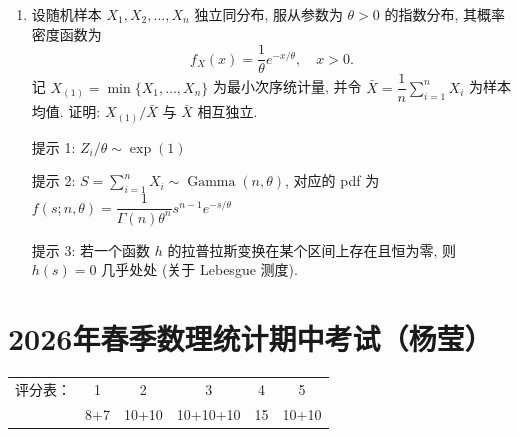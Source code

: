 \begin{enumerate}
\item 设随机样本 $X_1,X_2,\ldots,X_n$ 独立同分布, 服从参数为 $\theta>0$ 的指数分布, 其概率密度函数为
\[
f_X(x)=\frac{1}{\theta}e^{-x/\theta},\quad x>0.
\]
记 $X_{(1)}=\min\{X_1,\ldots,X_n\}$ 为最小次序统计量, 并令 $\bar{X}=\dfrac{1}{n}\sum_{i=1}^n X_i$ 为样本均值. 证明: $X_{(1)}/\bar{X}$ 与 $\bar{X}$ 相互独立.

提示 1: $Z_i/\theta\sim \exp(1)$

提示 2: $S=\sum_{i=1}^n X_i\sim \operatorname{Gamma}(n,\theta)$, 对应的 pdf 为 $f(s;n,\theta)=\dfrac{1}{\Gamma(n)\theta^n}s^{n-1}e^{-s/\theta}$

提示 3: 若一个函数 $h$ 的拉普拉斯变换在某个区间上存在且恒为零, 则 $h(s)=0$ 几乎处处 (关于 Lebesgue 测度).
\end{enumerate}


\section{2026年春季数理统计期中考试（杨莹）}


\begin{center}\begin{tabular}{|c|c|c|c|c|c|}
\hline
评分表： & 1 & 2 & 3 & 4 & 5 \\
 & 8+7 & 10+10 & 10+10+10 & 15 & 10+10 
\end{tabular}\end{center}

